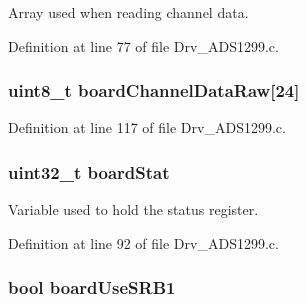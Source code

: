 Array used when reading channel data. 



Definition at line 77 of file Drv\+\_\+\+A\+D\+S1299.\+c.

\subsubsection[{\texorpdfstring{board\+Channel\+Data\+Raw}{boardChannelDataRaw}}]{\setlength{\rightskip}{0pt plus 5cm}uint8\+\_\+t board\+Channel\+Data\+Raw\mbox{[}24\mbox{]}}\hypertarget{group__ADS1299__Library_gaa891a075c92bada339ffdb3a6f8c5ac8}{}\label{group__ADS1299__Library_gaa891a075c92bada339ffdb3a6f8c5ac8}


Definition at line 117 of file Drv\+\_\+\+A\+D\+S1299.\+c.

\subsubsection[{\texorpdfstring{board\+Stat}{boardStat}}]{\setlength{\rightskip}{0pt plus 5cm}uint32\+\_\+t board\+Stat}\hypertarget{group__ADS1299__Library_ga50edda929d7766e162d89ec32181a93a}{}\label{group__ADS1299__Library_ga50edda929d7766e162d89ec32181a93a}


Variable used to hold the status register. 



Definition at line 92 of file Drv\+\_\+\+A\+D\+S1299.\+c.

\subsubsection[{\texorpdfstring{board\+Use\+S\+R\+B1}{boardUseSRB1}}]{\setlength{\rightskip}{0pt plus 5cm}bool board\+Use\+S\+R\+B1}\hypertarget{group__ADS1299__Library_ga1e02fad8a694c8bbfeba493b8be214e4}{}\label{group__ADS1299__Library_ga1e02fad8a694c8bbfeba493b8be214e4}


